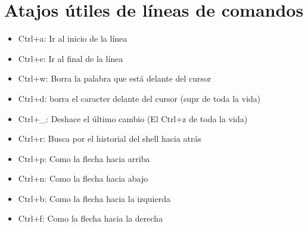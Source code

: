 \documentclass{article}
\begin{document}
\section{Atajos útiles de líneas de comandos}
\begin{itemize}
  \item Ctrl+a: Ir al inicio de la línea
  \item Ctrl+e: Ir al final de la línea
  \item Ctrl+w: Borra la palabra que está delante del cursor
  \item Ctrl+d: borra el caracter delante del cursor (supr de toda la vida)
  \item Ctrl+\_: Deshace el último cambio (El Ctrl+z de toda la vida)
  \item Ctrl+r: Busca por el historial del shell hacia atrás
  \item Ctrl+p: Como la flecha hacia arriba
  \item Ctrl+n: Como la flecha hacia abajo
  \item Ctrl+b: Como la flecha hacia la izquierda
  \item Ctrl+f: Como la flecha hacia la derecha
\end{itemize}
\end{document}
